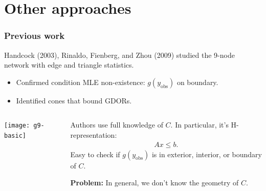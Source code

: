 \documentclass[ 10pt]{beamer}
\newcommand{\yobs}{y_{\text{obs}}}
\begin{document}
\section{Other approaches}
\frame
{
  \frametitle{Previous work}  
Handcock (2003), Rinaldo, Fienberg, and Zhou (2009) studied the 9-node network
with edge and triangle statistics.
\begin{itemize}
	\item Confirmed condition MLE non-existence: $g(\yobs)$ on boundary.  
	\item Identified cones that bound GDORs.%
\end{itemize}
\pause

\begin{columns}[]
\begin{column}[T]{0.4\textwidth}
\texttt{[image: g9-basic]}
\end{column}

\begin{column}[t]{0.6\textwidth}
\vspace{1mm}

Authors use full knowledge of $C$.  In particular, it's H-representation:
\begin{align*}
	Ax \leq b.
\end{align*}
Easy to check if $g(\yobs)$ is in exterior, interior, or boundary of $C$.
\vspace{1mm}

\pause
\begin{block}{}
{\alert{\textbf{Problem:} In general, we don't know the geometry of $C$.} }
\end{block}
\end{column}
\end{columns}


}

\end{document}
